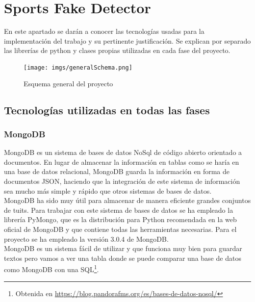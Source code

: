 \documentclass[../all.tex]{subfiles}
\begin{document}
    \section{Sports Fake Detector}

	En este apartado se darán a conocer las tecnologías usadas para la implementación del trabajo y su pertinente justificación. Se explican por separado las librerías de python y clases propias utilizadas en cada fase del proyecto.
	
	\begin{figure}[H]
		\centering
		\texttt{[image: imgs/generalSchema.png]}
		\caption{Esquema general del proyecto}
	\end{figure}
	
	
\subsection{Tecnologías utilizadas en todas las fases}
    \subsubsection{MongoDB}
        MongoDB es un sistema de bases de datos NoSql de código abierto orientado a documentos. En lugar de almacenar la información en tablas como se haría en una base de datos relacional, MongoDB guarda la información en forma de documentos JSON, haciendo que la integración de este sistema de información sea mucho más simple y rápido que otros sistemas de bases de datos.\\
        
        MongoDB ha sido muy útil para almacenar de manera eficiente grandes conjuntos de tuits. Para trabajar con este sistema de bases de datos se ha empleado la librería PyMongo, que es la distribución para Python recomendada en la web oficial de MongoDB y que contiene todas las herramientas necesarias. Para el proyecto se ha empleado la versión 3.0.4 de MongoDB.\\
        
        MongoDB es un sistema fácil de utilizar y que funciona muy bien para guardar textos pero vamos a ver una tabla donde se puede comparar una base de datos como MongoDB con una SQL\footnote{Obtenida en \url{https://blog.pandorafms.org/es/bases-de-datos-nosql/}}.
        
\end{document}
